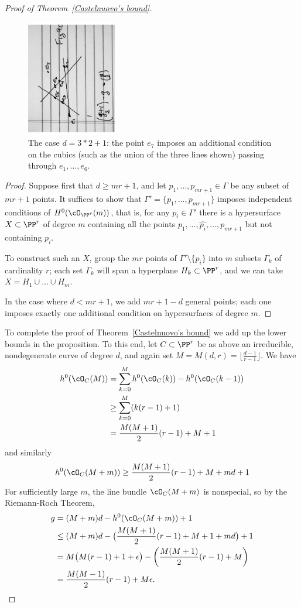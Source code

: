 \begin{proof}[Proof of Theorem~\ref{Castelnuovo's bound}]
\begin{figure}
\begin{center}
\centerline {\includegraphics[height=2in]{"Fig9C.pdf"}}
\caption{The case $d = 3*2+1$: the point $e_{7}$ imposes an additional
condition on the cubics (such as the union of the three lines shown) passing through
$e_{1},\dots, e_{6}$.}
\label{Fig9C}
\end{center}
\end{figure}

\begin{proof}
Suppose first that $d \geq mr+1$, and let $p_1,\dots,p_{mr+1} \in \Gamma$ be any subset of $mr+1$ points. It suffices to show that $\Gamma' = \{p_1,\dots,p_{mr+1}\}$ imposes independent conditions of $H^0(\cO_{\PP^r}(m))$, that is, for any $p_i \in \Gamma'$ there is a hypersurface $X \subset \PP^r$ of degree $m$ containing all the points $p_1,\dots, \hat{p_i},\dots,p_{mr+1}$ but not containing $p_i$.

To construct such an $X$, group the $mr$ points of $\Gamma' \setminus \{p_i\}$ into $m$ subsets $\Gamma_k$ of cardinality $r$; each set $\Gamma_k$ will span a hyperplane $H_k \subset \PP^r$, and we can take $X = H_1 \cup \dots \cup H_m$. 

In the case where $d<mr+1$, we add $mr+1-d$ general points; each one imposes exactly one
additional condition on hypersurfaces of degree $m$.
\end{proof}


To complete the proof of Theorem~\ref{Castelnuovo's bound} we add up the lower bounds in the proposition. To this end, let $C \subset \PP^r$ be as above an irreducible, nondegenerate curve of degree $d$, and again set 
$M = M(d,r) = \lfloor{\frac{d-1}{r-1}}\rfloor$.
We have 
\begin{align*}
h^0(\cO_C(M)) &= \sum_{k=0}^M h^0(\cO_C(k)) - h^0(\cO_C(k-1)) \\
&\geq  \sum_{k=0}^M (k(r-1)+1) \\
&= \frac{M(M+1)}{2}(r-1) + M + 1
\end{align*}
and similarly
$$
h^0(\cO_C(M+m)) \geq \frac{M(M+1)}{2}(r-1) + M  + md+ 1
$$
For sufficiently large $m$, the line bundle $\cO_C(M+m)$ is nonspecial, so by the Riemann-Roch Theorem,
\begin{align*}
g &= (M+m)d - h^0(\cO_C(M+m)) + 1 \\
&\leq (M+m)d - \bigl(  \frac{M(M+1)}{2}(r-1) + M + 1 + md \bigr)+1 \\
& = M\bigl( M(r-1) + 1 + \epsilon \bigr) - \left(  \frac{M(M+1)}{2}(r-1) + M  \right) \\
&= \frac{M(M-1)}{2}(r-1) + M\epsilon.
\end{align*}



\end{proof}
